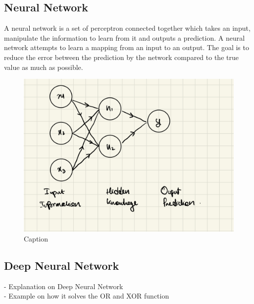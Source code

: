 \subsection{Neural Network}
A neural network is a set of perceptron connected together which takes an input, manipulate the information to learn from it and outputs a prediction. A neural network attempts to learn a mapping from an input to an output. The goal is to reduce the error between the prediction by the network compared to the true value as much as possible.
\begin{figure}[h]
  \centering
  \includegraphics[scale=0.15]{CHAPTER_2/c2_fig_neural_network_1.jpeg}
  \caption{Caption}
  \label{neural_network}
\end{figure}
\vspace{30mm}

\subsection{Deep Neural Network}
- Explanation on Deep Neural Network \\
- Example on how it solves the OR and XOR function
